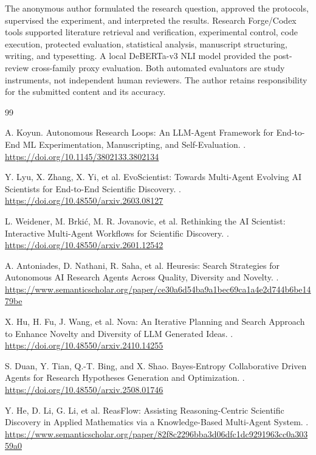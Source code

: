 \documentclass[11pt]{article}
\begin{document}
The anonymous author formulated the research question, approved the protocols, supervised the experiment, and interpreted the results. Research Forge/Codex tools supported literature retrieval and verification, experimental control, code execution, protected evaluation, statistical analysis, manuscript structuring, writing, and typesetting. A local DeBERTa-v3 NLI model provided the post-review cross-family proxy evaluation. Both automated evaluators are study instruments, not independent human reviewers. The author retains responsibility for the submitted content and its accuracy.

\begin{thebibliography}{99}

A. Koyun.
\newblock Autonomous Research Loops: An LLM-Agent Framework for End-to-End ML Experimentation, Manuscripting, and Self-Evaluation.
. \url{https://doi.org/10.1145/3802133.3802134}

Y. Lyu, X. Zhang, X. Yi, et al.
\newblock EvoScientist: Towards Multi-Agent Evolving AI Scientists for End-to-End Scientific Discovery.
. \url{https://doi.org/10.48550/arxiv.2603.08127}

L. Weidener, M. Brki\'c, M. R. Jovanovic, et al.
\newblock Rethinking the AI Scientist: Interactive Multi-Agent Workflows for Scientific Discovery.
. \url{https://doi.org/10.48550/arxiv.2601.12542}

A. Antoniades, D. Nathani, R. Saha, et al.
\newblock Heuresis: Search Strategies for Autonomous AI Research Agents Across Quality, Diversity and Novelty.
. \url{https://www.semanticscholar.org/paper/ce30a6d54ba9a1bec69ca1a4e2d744b6be1479be}

X. Hu, H. Fu, J. Wang, et al.
\newblock Nova: An Iterative Planning and Search Approach to Enhance Novelty and Diversity of LLM Generated Ideas.
. \url{https://doi.org/10.48550/arxiv.2410.14255}

S. Duan, Y. Tian, Q.-T. Bing, and X. Shao.
\newblock Bayes-Entropy Collaborative Driven Agents for Research Hypotheses Generation and Optimization.
. \url{https://doi.org/10.48550/arxiv.2508.01746}

Y. He, D. Li, G. Li, et al.
\newblock ReasFlow: Assisting Reasoning-Centric Scientific Discovery in Applied Mathematics via a Knowledge-Based Multi-Agent System.
. \url{https://www.semanticscholar.org/paper/82f8c2296bba3d06dfc1dc9291963cc0a30359a0}


\end{thebibliography}
\end{document}

